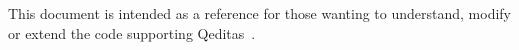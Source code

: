This document is intended as a reference
for those wanting to understand, modify or extend the
code supporting Qeditas~\cite{White2015c}.



